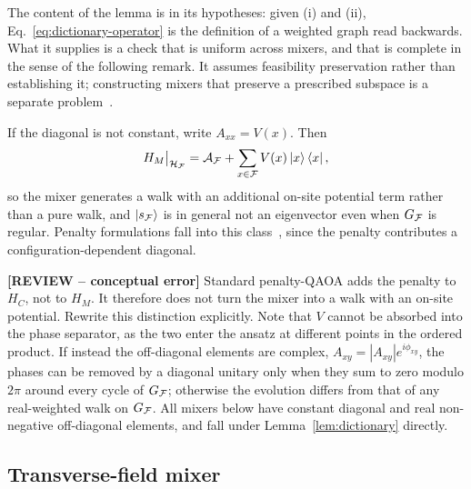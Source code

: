 The content of the lemma is in its hypotheses: given (i) and (ii), Eq.~\eqref{eq:dictionary-operator} is the definition of a weighted graph read backwards. What it supplies is a check that is uniform across mixers, and that is complete in the sense of the following remark. It assumes feasibility preservation rather than establishing it; constructing mixers that preserve a prescribed subspace is a separate problem~\cite{Fuchs2022,Fuchs2024}.

\begin{remark}  
\label{rem:failure}
If the diagonal is not constant, write $A_{xx}=V(x)$. Then
\begin{equation}
    H_M\big|_{\mathcal{H}_{\mathcal{F}}}
    =
    \mathcal{A}_{\mathcal{F}}+\sum_{x\in\mathcal{F}}V(x)\ket{x}\bra{x},
    \label{eq:potential}
\end{equation}
so the mixer generates a walk with an additional on-site potential term rather than a pure walk, and $\ket{s_{\mathcal{F}}}$ is in general not an eigenvector even when $G_{\mathcal{F}}$ is regular. Penalty formulations fall into this class~\cite{Lucas2014}, since the penalty contributes a configuration-dependent diagonal.

{\color{red}\textbf{[REVIEW -- conceptual error]} Standard penalty-QAOA adds the penalty to $H_C$, not to $H_M$. It therefore does not turn the mixer into a walk with an on-site potential. Rewrite this distinction explicitly.} Note that $V$ cannot be absorbed into the phase separator, as the two enter the ansatz at different points in the ordered product. If instead the off-diagonal elements are complex, $A_{xy}=|A_{xy}|e^{i\phi_{xy}}$, the phases can be removed by a diagonal unitary only when they sum to zero modulo $2\pi$ around every cycle of $G_{\mathcal{F}}$; otherwise the evolution differs from that of any real-weighted walk on $G_{\mathcal{F}}$. All mixers below have constant diagonal and real non-negative off-diagonal elements, and fall under Lemma~\ref{lem:dictionary} directly.
\end{remark}

\subsection{\label{subsec:transverse}Transverse-field mixer}

